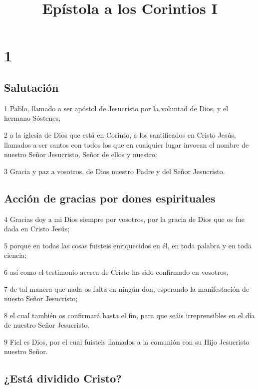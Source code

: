 
\title{Epístola a los Corintios I}

\chapter{1}

\section*{Salutación}

\par 1 Pablo, llamado a ser apóstol de Jesucristo por la voluntad de Dios, y el hermano Sóstenes,
\par 2 a la iglesia de Dios que está en Corinto, a los santificados en Cristo Jesús, llamados a ser santos con todos los que en cualquier lugar invocan el nombre de nuestro Señor Jesucristo, Señor de ellos y nuestro:
\par 3 Gracia y paz a vosotros, de Dios nuestro Padre y del Señor Jesucristo.

\section*{Acción de gracias por dones espirituales}

\par 4 Gracias doy a mi Dios siempre por vosotros, por la gracia de Dios que os fue dada en Cristo Jesús;
\par 5 porque en todas las cosas fuisteis enriquecidos en él, en toda palabra y en toda ciencia;
\par 6 así como el testimonio acerca de Cristo ha sido confirmado en vosotros,
\par 7 de tal manera que nada os falta en ningún don, esperando la manifestación de nuesto Señor Jesucristo;
\par 8 el cual también os confirmará hasta el fin, para que seáis irreprensibles en el día de nuestro Señor Jesucristo.
\par 9 Fiel es Dios, por el cual fuisteis llamados a la comunión con su Hijo Jesucristo nuestro Señor.

\section*{¿Está dividido Cristo?}

